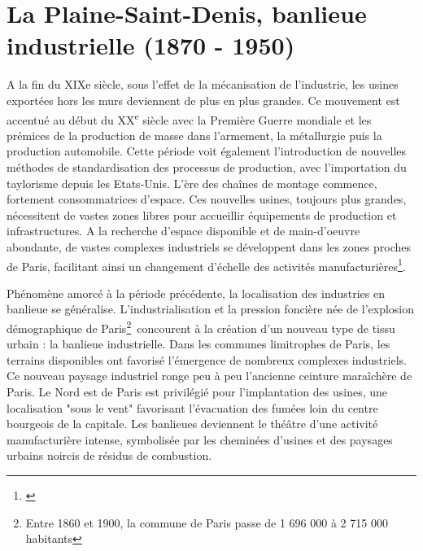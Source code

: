 \documentclass[a4paper,twoside,12pt]{book}
\newcommand{\siecle}[1]{\textsc{#1}\textsuperscript{e} siècle}
\begin{document}

\section{La Plaine-Saint-Denis, banlieue industrielle (1870 - 1950)}
A la fin du XIXe siècle, sous l'effet de la mécanisation de l'industrie, les usines exportées hors les murs deviennent de plus en plus grandes. Ce mouvement est accentué au début du \siecle{XX} avec la Première Guerre mondiale et les prémices de la production de masse dans l'armement, la métallurgie puis la production automobile. Cette période voit également l'introduction de nouvelles méthodes de standardisation des processus de production, avec l'importation du taylorisme depuis les Etats-Unis. L'ère des chaînes de montage commence, fortement consommatrices d'espace. Ces nouvelles usines, toujours plus grandes, nécessitent de vastes zones libres pour accueillir équipements de production et infrastructures. A la recherche d'espace disponible et de main-d'oeuvre abondante, de vastes complexes industriels se développent dans les zones proches de Paris, facilitant ainsi un changement d'échelle des activités manufacturières\footnote{\cite{tabeaud_lusine_2001}}.

Phénomène amorcé à la période précédente, la localisation des industries en banlieue se généralise. L'industrialisation et la pression foncière née de l'explosion démographique de Paris\footnote{Entre 1860 et 1900, la commune de Paris passe de 1 696 000 à 2 715 000 habitants} concourent à la création d'un nouveau type de tissu urbain : la banlieue industrielle. Dans les communes limitrophes de Paris, les terrains disponibles ont favorisé l'émergence de nombreux complexes industriels. Ce nouveau paysage industriel ronge peu à peu l'ancienne ceinture maraîchère de Paris. Le Nord est de Paris est privilégié pour l'implantation des usines, une localisation "sous le vent" favorisant l'évacuation des fumées loin du centre bourgeois de la capitale. Les banlieues deviennent le théâtre d'une activité manufacturière intense, symbolisée par les cheminées d'usines et des paysages urbains noircis de résidus de combustion. 
\end{document}
